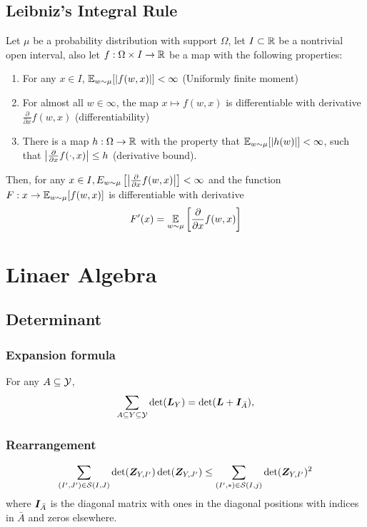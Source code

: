 \documentclass[10pt]{article}
\begin{document}
\subsection{Leibniz's Integral Rule}  
Let $\mu$ be a probability distribution with support $\Omega$, let $I \subset \mathbb{R}$ be a nontrivial open interval, also let $f: \Omega \times I \to \mathbb{R}$ be a map with the following properties:
\begin{enumerate}
    \item For any $x \in I$, $\mathop{\mathbb{E} \displaystyle}_{w \sim \mu} [ | f(w,x) | ] < \infty$ (\alert{Uniformly finite moment}) 
    \item For almost all $w \in \infty$, the map $x \mapsto f(w,x)$ is differentiable with derivative $\frac{\partial}{\partial x} f(w, x)$ (\alert{differentiability}) 
    \item There is a map  $h: \Omega \to \mathbb{R}$ with the property that $\mathop{\mathbb{E} \displaystyle}_{w \sim \mu}  [ | h(w)|] < \infty$, such that $\left| \frac{\partial }{\partial x} f(\cdot, x) \right| \leq h$ (\alert{derivative bound}). 
\end{enumerate}
Then, for any $x \in I, E_{w \sim \mu} \left[ \left| \frac{\partial}{\partial x} f(w,x) \right| \right] < \infty$ and the function $F: x \to \mathop{\mathbb{E} \displaystyle}_{w \sim \mu} [f(w,x)] $ is differentiable with derivative 
\begin{equation}
    F'(x) = \mathop{\mathbb{E} \displaystyle}_{w \sim \mu} \left[ \frac{\partial}{\partial x} f(w,x) \right]
\end{equation}
\section{Linaer Algebra}

\subsection{Determinant}
\subsubsection{Expansion formula}
For any $A \subseteq \mathcal{Y}$, 
\begin{equation}
    \sum_{A \subseteq Y \subseteq \mathcal{Y}} \det({\bm{L}}_Y) = \det({\bm{L}} + {\bm{I}}_{\bar{A}}), 
\end{equation}
\subsubsection{Rearrangement}
\begin{equation}
    \sum_{(I^{\prime}, J^{\prime}) \in \mathcal{S}(I,J)} \det ({\bm{Z}}_{Y, I^{\prime}}) \det ({\bm{Z}}_{Y, J^{\prime}})  \leq \sum_{(I^{\prime}, *) \in \mathcal{S}(I, j)} \det({\bm{Z}}_{Y, I^{\prime}})^2  
\end{equation}
where ${\bm{I}}_{\bar{A}}$ is the diagonal matrix with ones in the diagonal positions with indices in $\bar{A}$ and zeros elsewhere. 
\end{document}
